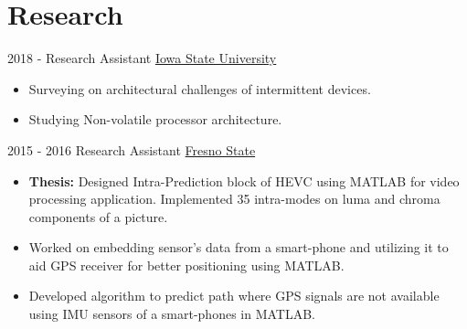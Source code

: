 \documentclass[letterpaper]{twentysecondcv} %
\begin{document}
\section{Research}
\begin{twenty}
	\twentyitem
    	{2018 - }
		{}
        {Research Assistant}
        {\href{https://www.iastate.edu/}{Iowa State University}}
        {}
        {
        {\begin{itemize}
        \item Surveying on architectural challenges of intermittent devices. 
        \item Studying Non-volatile processor architecture.\vspace{2mm}
		\end{itemize}}
        }
        
    \twentyitem
    	{2015 - 2016}
		{}
        {Research Assistant}
        {\href{https://www.fresnostate.edu/engineering/elec-computer/}{Fresno State}}
        {}
        {
        {\begin{itemize}
        \item \textbf{Thesis:} Designed Intra-Prediction block of HEVC using MATLAB for video processing application. Implemented 35 intra-modes on luma and chroma components of a picture.
\item Worked on embedding sensor’s data from a smart-phone and utilizing it to aid GPS receiver for better positioning using MATLAB. 
        \item Developed algorithm to predict path where GPS signals are not available using IMU sensors of a smart-phones in MATLAB. 
		\end{itemize}}
        }
        
        
\end{twenty}
\end{document}
